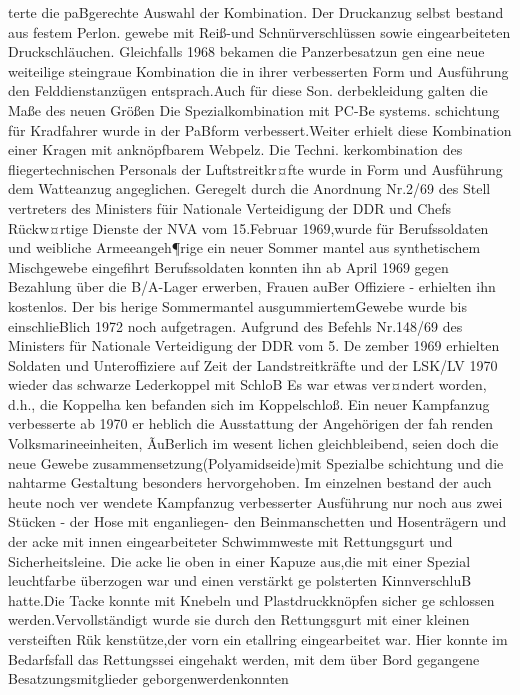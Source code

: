 terte die paBgerechte Auswahl der Kombination.
Der Druckanzug selbst bestand aus festem Perlon.
gewebe mit Reiß-und Schnürverschlüssen sowie
eingearbeiteten Druckschläuchen.
Gleichfalls 1968 bekamen die Panzerbesatzun
gen eine neue weiteilige steingraue Kombination
die in ihrer verbesserten Form und Ausführung den
Felddienstanzügen entsprach.Auch für diese Son.
derbekleidung galten die Maße des neuen Größen
Die Spezialkombination mit PC-Be
systems.
schichtung für Kradfahrer wurde in der PaBform
verbessert.Weiter erhielt diese Kombination einer
Kragen mit anknöpfbarem Webpelz. Die Techni.
kerkombination des fliegertechnischen Personals
der Luftstreitkr¤fte wurde in Form und Ausführung
dem Watteanzug angeglichen.
Geregelt durch die Anordnung Nr.2/69 des Stell
vertreters des Ministers füir Nationale Verteidigung
der DDR und Chefs Rückw¤rtige Dienste der NVA
vom 15.Februar 1969,wurde für Berufssoldaten
und weibliche Armeeangeh¶rige ein neuer Sommer
mantel aus synthetischem Mischgewebe eingefihrt
Berufssoldaten konnten ihn ab April 1969 gegen
Bezahlung über die B/A-Lager erwerben, Frauen
auBer Offiziere - erhielten ihn kostenlos. Der bis
herige Sommermantel ausgummiertemGewebe
wurde bis einschlieBlich 1972 noch aufgetragen.
Aufgrund des Befehls Nr.148/69 des Ministers für Nationale Verteidigung der DDR vom 5. De
zember 1969 erhielten Soldaten und Unteroffiziere
auf Zeit der Landstreitkräfte und der LSK/LV
1970 wieder das schwarze Lederkoppel mit SchloB
Es war etwas ver¤ndert worden, d.h., die Koppelha
ken befanden sich im Koppelschloß.
Ein neuer Kampfanzug verbesserte ab 1970 er
heblich die Ausstattung der Angehörigen der fah
renden Volksmarineeinheiten, ÃuBerlich im wesent
lichen gleichbleibend, seien doch die neue Gewebe
zusammensetzung(Polyamidseide)mit Spezialbe
schichtung und die nahtarme Gestaltung besonders
hervorgehoben.
Im einzelnen bestand der auch heute noch ver
wendete Kampfanzug verbesserter Ausführung nur
noch aus zwei Stücken - der Hose mit enganliegen-
den Beinmanschetten und Hosenträgern und der
acke mit innen eingearbeiteter Schwimmweste mit
Rettungsgurt und Sicherheitsleine. Die acke lie
oben in einer Kapuze aus,die mit einer Spezial
leuchtfarbe überzogen war und einen verstärkt ge
polsterten KinnverschluB hatte.Die Tacke konnte
mit Knebeln und Plastdruckknöpfen sicher ge
schlossen werden.Vervollständigt wurde sie durch
den Rettungsgurt mit einer kleinen versteiften Rük
kenstütze,der vorn ein etallring eingearbeitet
war. Hier konnte im Bedarfsfall das Rettungssei
eingehakt werden, mit dem über Bord gegangene
Besatzungsmitglieder geborgenwerdenkonnten
